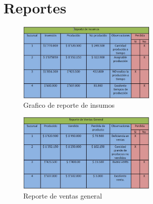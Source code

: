 \chapter{Reportes}
\begin{figure}[htbp]
	\centering
		\includegraphics[width=0.60\textwidth]{images/REPORTEINSUMOS.jpg}
	\caption{Grafico de reporte de insumos}
	\label{fig:Grafico de reporte de insumos}
\end{figure}%
\begin{figure}[htbp]
	\centering
		\includegraphics[width=0.60\textwidth]{images/REPORTEVENTASGENERAL.jpg}
	\caption{Reporte de ventas general}
	\label{fig:Reporte de ventas general}
\end{figure}%
